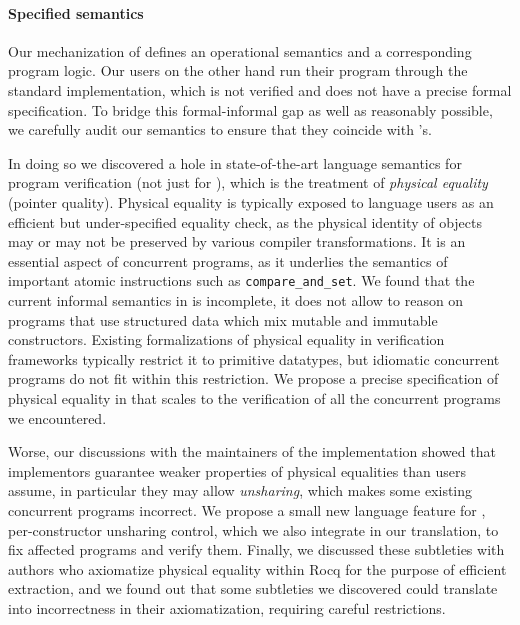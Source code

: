 \paragraph{Specified \OCaml semantics} Our \Iris mechanization of \ZooLang defines an operational semantics and a corresponding program logic. Our users on the other hand run their program through the standard \OCaml implementation, which is not verified and does not have a precise formal specification. To bridge this formal-informal gap as well as reasonably possible, we carefully audit our \ZooLang semantics to ensure that they coincide with \OCaml's.

In doing so we discovered a hole in state-of-the-art language semantics for program verification (not just for \OCaml), which is the treatment of \emph{physical equality} (pointer quality). Physical equality is typically exposed to language users as an efficient but under-specified equality check, as the physical identity of objects may or may not be preserved by various compiler transformations. It is an essential aspect of concurrent programs, as it underlies the semantics of important atomic instructions such as \texttt{compare\_and\_set}. We found that the current informal semantics in \OCaml is incomplete, it does not allow to reason on programs that use structured data which mix mutable and immutable constructors. Existing formalizations of physical equality in verification frameworks typically restrict it to primitive datatypes, but idiomatic concurrent programs do not fit within this restriction. We propose a precise specification of physical equality in \Zoo that scales to the verification of all the concurrent programs we encountered.

Worse, our discussions with the maintainers of the \OCaml implementation showed that implementors guarantee weaker properties of physical equalities than users assume, in particular they may allow \emph{unsharing}, which makes some existing concurrent programs incorrect. We propose a small new language feature for \OCaml, per-constructor unsharing control, which we also integrate in our \ZooLang translation, to fix affected programs and verify them. Finally, we discussed these subtleties with authors who axiomatize physical equality within Rocq for the purpose of efficient extraction, and we found out that some subtleties we discovered could translate into incorrectness in their axiomatization, requiring careful restrictions.

